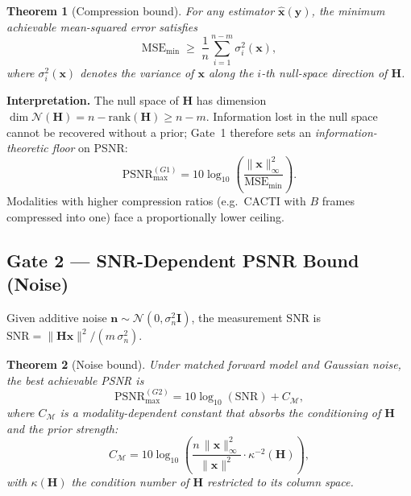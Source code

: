 \documentclass[11pt]{article}
\newtheorem{theorem}{Theorem}
\begin{document}
\begin{theorem}[Compression bound]
For any estimator $\hat{\mathbf{x}}(\mathbf{y})$, the minimum achievable
mean-squared error satisfies
\begin{equation}
  \mathrm{MSE}_{\min} \;\geq\;
  \frac{1}{n}\sum_{i=1}^{n-m} \sigma_i^2(\mathbf{x}),
  \label{eq:gate1}
\end{equation}
where $\sigma_i^2(\mathbf{x})$ denotes the variance of $\mathbf{x}$ along the
$i$-th null-space direction of $\mathbf{H}$.
\end{theorem}

\noindent\textbf{Interpretation.}
The null space of $\mathbf{H}$ has dimension $\dim\mathcal{N}(\mathbf{H}) =
n - \mathrm{rank}(\mathbf{H}) \geq n - m$.  Information lost in the null space
cannot be recovered without a prior; Gate~1 therefore sets an
\emph{information-theoretic floor} on PSNR:
\begin{equation}
  \mathrm{PSNR}_{\max}^{(G1)}
  = 10\log_{10}\!\!\left(\frac{\|\mathbf{x}\|_\infty^2}{\mathrm{MSE}_{\min}}\right).
\end{equation}
Modalities with higher compression ratios (e.g.\ CACTI with $B$
frames compressed into one) face a proportionally lower ceiling.

\subsection{Gate 2 --- SNR-Dependent PSNR Bound (Noise)}

Given additive noise $\mathbf{n}\sim\mathcal{N}(0,\sigma_n^2\mathbf{I})$,
the measurement SNR is $\mathrm{SNR} = \|\mathbf{H}\mathbf{x}\|^2 /
(m\,\sigma_n^2)$.

\begin{theorem}[Noise bound]
Under matched forward model and Gaussian noise, the best achievable PSNR is
\begin{equation}
  \mathrm{PSNR}_{\max}^{(G2)}
  = 10\log_{10}(\mathrm{SNR}) + C_{\mathcal{M}},
  \label{eq:gate2}
\end{equation}
where $C_{\mathcal{M}}$ is a modality-dependent constant that absorbs
the conditioning of $\mathbf{H}$ and the prior strength:
\begin{equation}
  C_{\mathcal{M}}
  = 10\log_{10}\!\left(
      \frac{n\,\|\mathbf{x}\|_\infty^2}{\|\mathbf{x}\|^2}
      \cdot \kappa^{-2}(\mathbf{H})
    \right),
\end{equation}
with $\kappa(\mathbf{H})$ the condition number of $\mathbf{H}$ restricted to
its column space.
\end{theorem}
\end{document}
